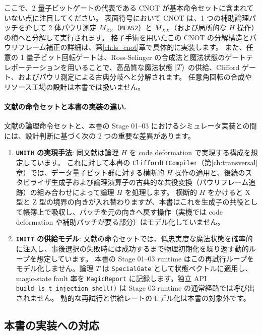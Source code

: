 ここで、2 量子ビットゲートの代表である CNOT が基本命令セットに含まれていない点に注目してください。
表面符号において CNOT は、1 つの補助論理パッチを介して 2 体パウリ測定 $M_{ZZ}$（\texttt{MEAS2}）と $M_{XX}$（および局所的な $H$ 操作）の積へと分解して実行されます。
格子手術を用いたこの CNOT の分解構造とパウリフレーム補正の詳細は、第\ref{ch:ls_cnot}章で具体的に実装します。
また、任意の 1 量子ビット回転ゲートは、Ross-Selinger の合成法\cite{ross2016synthesis}と魔法状態のゲートテレポーテーションを用いることで、高品質な魔法状態 $\ket{T}$ の供給、Clifford ゲート、およびパウリ測定による古典分岐へと分解されます。
任意角回転の合成やリソース工場の設計は本書では扱いません。

\paragraph{文献の命令セットと本書の実装の違い.}
文献\cite{suzuki2026ftqc}の論理命令セットと、本書の Stage 01--03 におけるシミュレータ実装との間には、設計判断に基づく次の 2 つの重要な差異があります。

\begin{enumerate}
  \item \textbf{\texttt{UNITH} の実現手法}:
    同文献は論理 $H$ を code deformation で実現する構成を想定しています。
    これに対して本書の \lstinline{CliffordFTCompiler}（第\ref{ch:transversal}章）では、データ量子ビット群に対する横断的 $H$ 操作の適用と、後続のスタビライザ生成子および論理演算子の古典的な共役変換（パウリフレーム追跡）の組み合わせによって論理 $H$ を処理します。
    横断的 $H$ をかけると X 型と Z 型の境界の向きが入れ替わりますが、本書はこれを生成子の共役として帳簿上で吸収し、パッチを元の向きへ戻す操作（実機では code deformation や補助パッチが要る部分）はモデル化していません。
  \item \textbf{\texttt{INITT} の供給モデル}: 文献の命令セットでは、低忠実度な魔法状態を確率的に注入し、事後選択の失敗時には成功するまで物理初期化を繰り返す動的ループを想定しています。
    本書の Stage 01--03 runtime はこの再試行ループをモデル化しません。論理 $T$ は \lstinline{SpecialGate} として状態ベクトルに適用し、magic-state fault 率を \lstinline{MagicReport} に記録します。独立 API \lstinline{build_ls_t_injection_shell()} は Stage 03 runtime の通常経路では呼び出されません。
    動的な再試行と供給レートのモデル化は本書の対象外です。
\end{enumerate}

\subsection{本書の実装への対応}

